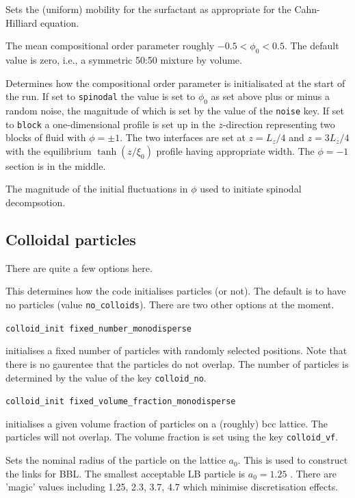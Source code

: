 Sets the (uniform) mobility for the surfactant as appropriate for
the Cahn-Hilliard equation.


The mean compositional order parameter roughly $-0.5 < \phi_0 < 0.5$.
The default value is zero, i.e., a symmetric 50:50 mixture by volume.


Determines how the compositional order parameter is initialisated
at the start of the run. If set to \texttt{spinodal} the value
is set to $\phi_0$ as set above plus or minus a random noise, the
magnitude of which is set by the value of the \texttt{noise} key.
If set to \texttt{block} a one-dimensional profile is set up in
the $z$-direction representing two blocks of fluid with
$\phi = \pm 1$. The two interfaces are set at $z = L_z/4$ and
$z = 3L_z/4$ with the equilibrium $\tanh(z/\xi_0)$ profile having 
appropriate width. The $\phi = -1$ section is in the middle.


The magnitude of the initial fluctuations in $\phi$ used to
initiate spinodal decompsotion.


\subsection{Colloidal particles}

There are quite a few options here.


This determines how the code initialises particles (or not). The
default is to have no particles (value \texttt{no\_colloids}). There
are two other options at the moment.

\texttt{colloid\_init    fixed\_number\_monodisperse}

initialises a fixed number of particles with randomly selected
positions. Note that there is no gaurentee that the particles
do not overlap. The number of particles is determined by
the value of the key \texttt{colloid\_no}.

\texttt{colloid\_init   fixed\_volume\_fraction\_monodisperse}

initialises a given volume fraction of particles on a (roughly)
bcc lattice. The particles will not overlap. The volume fraction
is set using the key \texttt{colloid\_vf}.


Sets the nominal radius of the particle on the lattice $a_0$. This is
used to construct the links for BBL. The smallest acceptable LB
particle is $a_0 = 1.25$ \cite{nl02}. There are 'magic' values
including 1.25, 2.3, 3.7, 4.7 which minimise discretisation effects.

